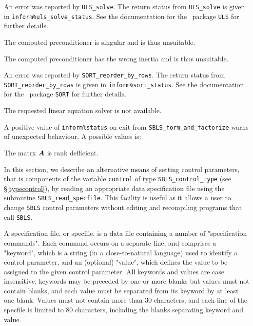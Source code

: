 \documentclass{galahad}
\newcommand{\packagename}{SBLS}
\begin{document}
\begin{description}
 An error was reported by {\tt ULS\_solve}. The return
status from {\tt ULS\_solve} is given in {\tt inform\%uls\_solve\_status}.
See the documentation for the \galahad\ package {\tt ULS} for further details.

 The computed preconditioner is singular
and is thus unsuitable.

 The computed preconditioner has the wrong
inertia and is thus unsuitable.

 An error was reported by {\tt SORT\_reorder\_by\_rows}.
The return status from {\tt SORT\_reorder\_by\_rows}
is given in {\tt inform\%sort\_status}.
See the documentation for the \galahad\ package {\tt SORT} for further details.

 The requested linear equation solver is not available.

\end{description}

A positive value of {\tt inform\%status} on exit from
{\tt \packagename\_form\_and\_factorize} warns of unexpected behaviour.
A possible values is:

\begin{description}

 The matrx ${\bm{A}}$ is rank defficient.

\end{description}


\galfeatures
\noindent In this section, we describe an alternative means of setting
control parameters, that is components of the variable {\tt control} of type
{\tt \packagename\_control\_type}
(see \S\ref{typecontrol}),
by reading an appropriate data specification file using the
subroutine {\tt \packagename\_read\_specfile}. This facility
is useful as it allows a user to change  {\tt \packagename} control parameters
without editing and recompiling programs that call {\tt \packagename}.

A specification file, or specfile, is a data file containing a number of
"specification commands". Each command occurs on a separate line,
and comprises a "keyword",
which is a string (in a close-to-natural language) used to identify a
control parameter, and
an (optional) "value", which defines the value to be assigned to the given
control parameter. All keywords and values are case insensitive,
keywords may be preceded by one or more blanks but
values must not contain blanks, and
each value must be separated from its keyword by at least one blank.
Values must not contain more than 30 characters, and
each line of the specfile is limited to 80 characters,
including the blanks separating keyword and value.
\end{document}
